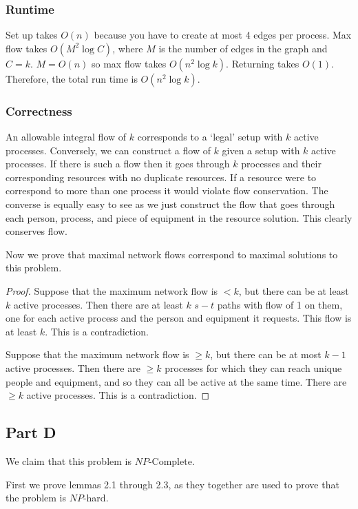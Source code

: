 \documentclass{article}
\begin{document}
\subsubsection{Runtime}
Set up takes $O(n)$ because you have to create at most 4 edges per process. 
Max flow takes $O(M^2 \log{C})$, where $M$ is the number of edges in the graph and $C = k$. $M = O(n)$ so max flow takes $O(n^2 \log{k})$.  Returning takes $O(1)$. Therefore, the total run time is $O(n^2 \log{k})$. 

\subsubsection{Correctness}
An allowable integral flow of $k$ corresponds to a `legal' setup with $k$ active processes. Conversely, we can construct a flow of $k$ given a setup with $k$ active processes. If there is such a flow then it goes through $k$ processes and their corresponding resources with no duplicate resources. If a resource were to correspond to more than one process it would violate flow conservation. The converse is equally easy to see as we just construct the flow that goes through each person, process, and piece of equipment in the resource solution. This clearly conserves flow.

Now we prove that maximal network flows correspond to maximal solutions to this problem.

\begin{proof}
Suppose that the maximum network flow is $< k$, but there can be at least $k$ active processes. Then there are at least $k$ $s-t$ paths with flow of 1 on them, one for each active process and the person and equipment it requests. This flow is at least $k$. This is a contradiction. 

Suppose that the maximum network flow is  $\geq k$, but there can be at most $k-1$ active processes. Then there are $\geq k$ processes for which they can reach unique people and equipment, and so they can all be active at the same time. There are $\geq k$ active processes. This is a contradiction. 
\end{proof}

\subsection{Part D}
We claim that this problem is $NP$-Complete.

First we prove lemmas 2.1 through 2.3, as they together are used to prove that the problem is $NP$-hard.
\end{document}
